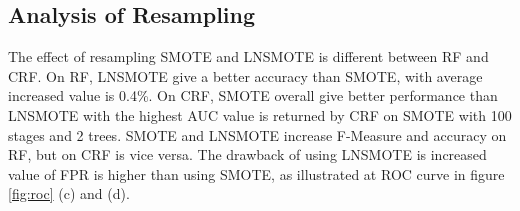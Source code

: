 \subsection{Analysis of Resampling}

The effect of resampling SMOTE and LNSMOTE is different between RF and CRF.
On RF, LNSMOTE give a better accuracy than SMOTE, with average increased value
is 0.4\%.
On CRF, SMOTE overall give better performance than LNSMOTE with the highest AUC
value is returned by CRF on SMOTE with 100 stages and 2 trees.
SMOTE and LNSMOTE increase F-Measure and accuracy on RF, but on CRF is vice
versa.
The drawback of using LNSMOTE is increased value of FPR is higher than using
SMOTE, as illustrated at ROC curve in figure \ref{fig:roc} (c) and (d).
